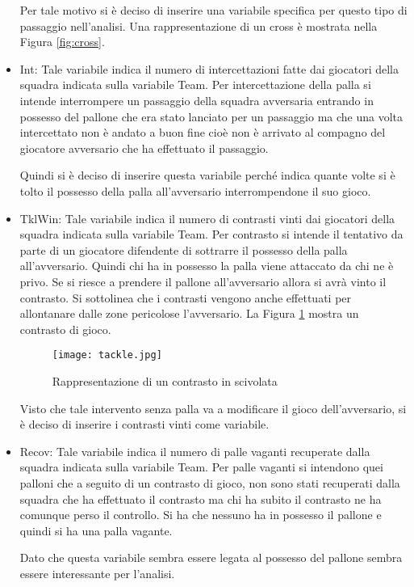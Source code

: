 \begin{itemize}
	Per tale motivo si è deciso di inserire una variabile specifica per questo tipo di passaggio nell'analisi. Una rappresentazione di un cross è mostrata nella Figura \ref{fig:cross}.
	\item \textsf{Int}: Tale variabile indica il numero di intercettazioni fatte dai giocatori della squadra indicata sulla variabile \textsf{Team}. Per intercettazione della palla si intende interrompere un passaggio della squadra avversaria entrando in possesso del pallone che era stato lanciato per un passaggio ma che una volta intercettato non è andato a buon fine cioè non è arrivato al compagno del giocatore avversario che ha effettuato il passaggio. 
	
	Quindi si è deciso di inserire questa variabile perché indica quante volte si è tolto il possesso della palla all'avversario interrompendone il suo gioco.
	\item \textsf{TklWin}: Tale variabile indica il numero di contrasti vinti dai giocatori della squadra indicata sulla variabile \textsf{Team}. Per contrasto si intende il tentativo da parte di un giocatore difendente di sottrarre il possesso della palla all'avversario. Quindi chi ha in possesso la palla viene attaccato da chi ne è privo. Se si riesce a prendere il pallone all'avversario allora si avrà vinto il contrasto. Si sottolinea che i contrasti vengono anche effettuati per allontanare dalle zone pericolose l'avversario. La Figura \ref{fig:tackle} mostra un contrasto di gioco.
	
	\begin{figure}[!h]
		\begin{center}
			\texttt{[image: tackle.jpg]}
			\caption{Rappresentazione di un contrasto in scivolata} \label{fig:tackle}
		\end{center}
	\end{figure}
	
	Visto che tale intervento senza palla va a modificare il gioco dell'avversario, si è deciso di inserire i contrasti vinti come variabile. 
	
	\item \textsf{Recov}: Tale variabile indica il numero di palle vaganti recuperate dalla squadra indicata sulla variabile \textsf{Team}. Per palle vaganti si intendono quei palloni che a seguito di un contrasto di gioco, non sono stati recuperati dalla squadra che ha effettuato il contrasto ma chi ha subito il contrasto ne ha comunque perso il controllo. Si ha che nessuno ha in possesso il pallone e quindi si ha una palla vagante.
	
	Dato che questa variabile sembra essere legata al possesso del pallone sembra essere interessante per l'analisi.
	
\end{itemize}
